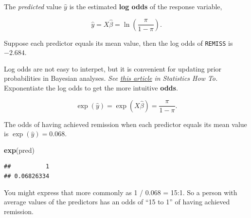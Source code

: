 \documentclass[
]{book}
\newenvironment{Shaded}{\begin{snugshade}}{\end{snugshade}}
\newcommand{\DataTypeTok}[1]{\textcolor[rgb]{0.13,0.29,0.53}{#1}}
\newcommand{\KeywordTok}[1]{\textcolor[rgb]{0.13,0.29,0.53}{\textbf{#1}}}
\newcommand{\NormalTok}[1]{#1}
\newcommand{\OperatorTok}[1]{\textcolor[rgb]{0.81,0.36,0.00}{\textbf{#1}}}
\newcommand{\StringTok}[1]{\textcolor[rgb]{0.31,0.60,0.02}{#1}}
\begin{document}
The \emph{predicted} value \(\hat{y}\) is the estimated \textbf{log odds} of the response variable,

\[\hat{y} = X \hat{\beta} = \ln (\frac{\pi}{1 - \pi}).\]

Suppose each predictor equals its mean value, then the log odds of \texttt{REMISS} is \(-2.684\).

\begin{Shaded}
\end{Shaded}

Log odds are not easy to interpet, but it is convenient for updating prior probabilities in Bayesian analyses. \emph{See \href{https://www.statisticshowto.datasciencecentral.com/log-odds/}{this article} in Statistics How To.} Exponentiate the log odds to get the more intuitive \textbf{odds}.

\[\exp (\hat{y}) = \exp (X \hat{\beta}) = \frac{\pi}{1 - \pi}.\]

The odds of having achieved remission when each predictor equals its mean value is \(\exp(\hat{y}) = 0.068\).

\begin{Shaded}
\begin{Highlighting}[]
\KeywordTok{exp}\NormalTok{(pred)}
\end{Highlighting}
\end{Shaded}

\begin{verbatim}
##          1 
## 0.06826334
\end{verbatim}

You might express that more commonly as 1 / 0.068 = 15:1. So a person with average values of the predictors has an odds of ``15 to 1'' of having achieved remission.
\end{document}
